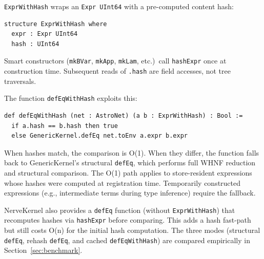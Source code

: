 \texttt{ExprWithHash} wraps an \texttt{Expr UInt64} with a pre-computed content hash:

\begin{lstlisting}[language={},morekeywords={structure,where,def}]
structure ExprWithHash where
  expr : Expr UInt64
  hash : UInt64
\end{lstlisting}

Smart constructors (\texttt{mkBVar}, \texttt{mkApp}, \texttt{mkLam}, etc.)\ call \texttt{hashExpr} once at construction time.  Subsequent reads of \texttt{.hash} are field accesses, not tree traversals.

The function \texttt{defEqWithHash} exploits this:

\begin{lstlisting}[language={},morekeywords={def,if,then,else}]
def defEqWithHash (net : AstroNet) (a b : ExprWithHash) : Bool :=
  if a.hash == b.hash then true
  else GenericKernel.defEq net.toEnv a.expr b.expr
\end{lstlisting}

When hashes match, the comparison is O(1).  When they differ, the function falls back to GenericKernel's structural \texttt{defEq}, which performs full WHNF reduction and structural comparison.  The O(1) path applies to store-resident expressions whose hashes were computed at registration time.  Temporarily constructed expressions (e.g., intermediate terms during type inference) require the fallback.

NerveKernel also provides a \texttt{defEq} function (without \texttt{ExprWithHash}) that recomputes hashes via \texttt{hashExpr} before comparing.  This adds a hash fast-path but still costs O(n) for the initial hash computation.  The three modes (structural \texttt{defEq}, rehash \texttt{defEq}, and cached \texttt{defEqWithHash}) are compared empirically in Section~\ref{sec:benchmark}.
